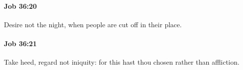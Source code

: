 		\paragraph{Job 36:20} %
			\label{JOB-36-20}

			Desire not the night, when people are cut off in their place.


		\paragraph{Job 36:21} %
			\label{JOB-36-21}

			Take heed, regard not iniquity: for this hast thou chosen rather than affliction.


